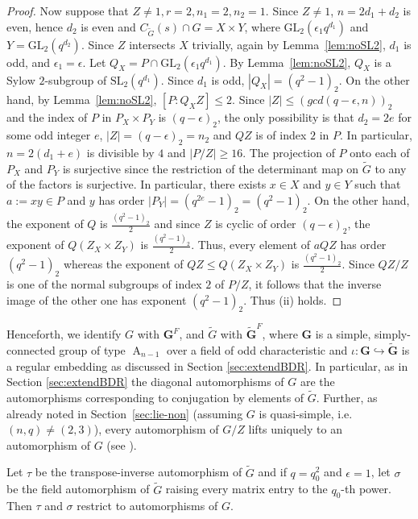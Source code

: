 \documentclass{amsart}
\theoremstyle{plain}\newtheorem{Theorem}{Theorem}[section]
\theoremstyle{plain}\newtheorem{Conjecture}[Theorem]{Conjecture}
\theoremstyle{plain}\newtheorem{Corollary}[Theorem]{Corollary}
\theoremstyle{plain}\newtheorem{Lemma}[Theorem]{Lemma}
\theoremstyle{plain}\newtheorem{Proposition}[Theorem]{Proposition}
\theoremstyle{definition}\newtheorem{Definition}[Theorem]{Definition}
\theoremstyle{definition}\newtheorem{Example}[Theorem]{Example}
\theoremstyle{definition}\newtheorem{Examples}[Theorem]{Examples}
\theoremstyle{definition}\newtheorem{Exercise}[Theorem]{Exercise}
\theoremstyle{definition}\newtheorem{Notation}[Theorem]{Notation}
\theoremstyle{definition}\newtheorem{Remark}[Theorem]{Remark}
\theoremstyle{definition}\newtheorem{Remarks}[Theorem]{Remarks}
\def\GL{\mathrm{GL}}
\def\SL{\mathrm{SL}}
\newcommand{\bG}{{\mathbf{G}}}
\newcommand{\type}{\operatorname}
\newcommand{\wt}{\widetilde}
\newcommand{\tA}{\type{A}}
\numberwithin{equation}{section}
\begin{document}
\begin{proof}
 
 Now suppose that $Z\ne 1,  r=2, n_1=2, n_2=1 $.  Since  $Z \ne1 $, $n =2d_1 +d_2$ is even, hence $d_2 $ is even and 
 $C_{\wt{G}}(s) \cap G  =  X \times Y $, where  $ \GL_2 (\epsilon_1 q^{d_1}) $  and $Y=  \GL_2 (q^{d_2})$.  Since   $Z$ intersects  $X$ trivially,    again by Lemma~\ref{lem:noSL2},  $d_1 $ is odd, and $\epsilon_1= \epsilon$.  Let $Q_X= P  \cap  \GL_2 (\epsilon_1 q^{d_1})$.  By Lemma~\ref{lem:noSL2}, $Q_X$ is a Sylow $2$-subgroup of  $\SL_2 (q^{d_1})  $. Since $d_1$ is odd,  $|Q_X| =(q^2-1)_2 $. On the other hand, by Lemma~\ref{lem:noSL2},  $[P: Q_XZ] \leq 2 $.    Since $|Z| \leq  (gcd(q-\epsilon,  n) )_2$ and  the index of   $P$  in   $P_X \times P_Y $  is   $(q-\epsilon)_2 $,    the only possibility is  that $d_2  = 2e $ for some odd integer $e$,   $|Z| = (q-\epsilon)_2 =  n_2  $ and $QZ  $ is of index $2$ in $P$.  In particular, $n= 2(d_1+ e) $ is  divisible by $4$ and   $|P/Z| \geq 16 $.
 The projection of $P$ onto each of $P_X$ and $P_Y$ is surjective since the  restriction of the determinant map on $\wt{G}$  to any of the factors is surjective.   In  particular, there  exists $x \in X$ and $y \in Y$  such that $a :=xy \in P$   and $y$ has order $|P_Y| =  (q^{2e}-1)_2 =  (q^2-1)_2$.       On the other hand, the  exponent of  $Q $ is $ \frac{(q^{2}-1)_2}{2} $  and  since   $Z$ is cyclic of order $(q-\epsilon)_2 $, the exponent of $Q (Z_X \times  Z_Y)  $  is  $ \frac{(q^{2}-1)_2}{2} $.   Thus,
 every element of $aQZ $  has order   $ (q^2-1)_2 $  whereas  the exponent   of   $QZ  \leq Q (Z_X \times  Z_Y)$   is $\frac{(q^2-1)_2}{2} $.   Since $QZ/Z$ is one of the normal subgroups of index $2$ of $P/Z$, it follows that the inverse image of the  other one    has exponent  $ (q^{2}-1)_2 $. Thus (ii) holds.
\end{proof}

Henceforth, we identify   $G$ with $\bG^F$,  and $\wt{G} $  with  $\wt{\bG}^F$, where  $\bG$  is a simple, simply-connected group of type $\tA_{n-1}$   over  a field  of odd characteristic and $\iota\colon\bG\hookrightarrow\wt\bG$ is a regular embedding as discussed in Section \ref{sec:extendBDR}.   In particular, as  in Section \ref{sec:extendBDR}  the   diagonal automorphisms  of $G$  are the automorphisms corresponding to conjugation by elements of $\wt{G}$.   Further, as already noted in Section~\ref{sec:lie-non} (assuming  $G$ is quasi-simple, i.e.  $(n,q) \ne (2,3)$), every automorphism  of   $ G/Z$ lifts  uniquely to an automorphism of $G$ (see \cite[Thm.~2.5.14]{GLS3}).   

Let $\tau $  be the transpose-inverse automorphism of  $\wt{G}$  and if  $q=q_0^2$  and $\epsilon =1$, let $\sigma $ be the  field  automorphism   of $\wt{G}$   raising every matrix  entry  to the  $q_0$-th power. Then $\tau $ and  $\sigma$ restrict to  automorphisms of $G$.  
\end{document}
